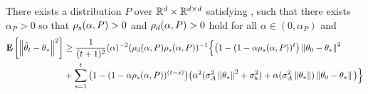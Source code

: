 \begin{theorem}\label{th:lb}
There exists a distribution $P$ over $\mathbb{R}^d\times \mathbb{R}^{d \times d}$ satisfying , such that
there exists $\alpha_P>0$ so that $\rho_s(\alpha,P)>0$ and $\rho_d(\alpha,P)>0$ hold for all $\alpha\in (0,\alpha_P)$ and
\begin{align*}
\mathbf{E}\left[\left\| \hat{\theta}_t-\theta_*\right\|^2\right] &\geq \frac{1}{(t+1)^2}(\alpha)^{-2}(\rho_d(\alpha,P)\rho_s(\alpha,P))^{-1}\Big\{ \big(1-(1-\alpha \rho_s(\alpha,P))^t\big) \left\| \theta_0-\theta_*\right\|^2 \\&+ \sum_{s=1}^t \big(1-(1-\alpha \rho_s(\alpha,P))^{(t-s)}\big) \big(\alpha^2(\sigma_A^2\left\| \theta_*\right\|^2+\sigma_b^2)+\alpha (\sigma_A^2\left\| \theta_*\right\|)\left\| \theta_0-\theta_*\right\|\big) \Big\}
\end{align*}

\begin{comment}
\begin{align}
\frac{1}{(t+1)^2}(\alpha \lambda_{\min})^{-2}(1-\alpha \lambda_{\min}^t) \theta^2_0(1)\leq \norm{\eh_t}^2\leq
\frac{1}{(t+1)^2} \left(\alpha^{-1}\rhos{P^0}+\alpha^{-2}\rhos{P^0}^2\right)\norm{\theta_0}^2
\end{align}
\end{comment}
\end{theorem}

